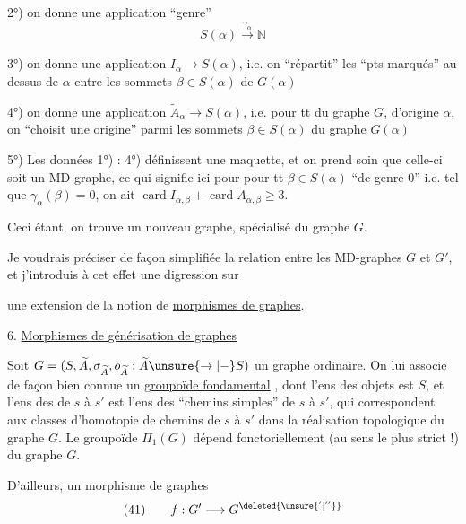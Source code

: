 2°) on  donne une application ``genre''
\[
S(\alpha)\xrightarrow{\gamma_\alpha}\mathbb N
\]

3°) on donne une application $I_\alpha\to S(\alpha)$, i.e. on ``répartit'' les  ``pts marqués'' au dessus de $\alpha$  entre les sommets $\beta\in S(\alpha)$ de $G(\alpha)$

4°) on donne une application $\widetilde A_\alpha\to S(\alpha)$, i.e. pour tt  du graphe $G$, d'origine $\alpha$, on  ``choisit une  origine'' parmi les sommets $\beta\in S(\alpha)$ du graphe $G(\alpha)$

5°) Les données 1°) : 4°) définissent une maquette,  et on prend soin que celle-ci soit un MD-graphe,  ce qui signifie ici pour pour tt $\beta\in S(\alpha)$ ``de genre 0'' i.e. tel que $\gamma_\alpha(\beta)=0$, on ait $\operatorname{card}I_{\alpha,\beta}+\operatorname{card}\widetilde A_{\alpha,\beta}\geq 3$.

Ceci étant, on trouve un nouveau graphe,  spécialisé du graphe $G$.

Je voudrais préciser de façon simplifiée la relation entre les MD-graphes $G$ et $G'$, et j'introduis à cet effet une digression sur

une extension de la notion de \uline{morphismes de graphes}.

\qquad{}

6. \uline{Morphismes de générisation de graphes }

Soit $G=(S,\widetilde A,\sigma_{\widetilde A},o_{\widetilde A}:\widetilde A\unsure{\to|{-}}S)$ un graphe ordinaire. On lui associe de façon bien connue un \uline{groupoïde fondamental} , dont l'ens des objets est $S$, et l'ens des  de $s$ à $s'$ est l'ens des ``chemins simples'' de $s$ à $s'$, qui correspondent aux classes d'homotopie de chemins de $s$ à $s'$ dans la réalisation topologique du graphe $G$. Le groupoïde $\Pi_1(G)$ dépend fonctoriellement (au sens le plus strict !) du graphe $G$.

D'ailleurs, un morphisme de graphes
\[
(41)\qquad f:G'\longrightarrow G^{\deleted{\unsure{'|''}}}
\]


